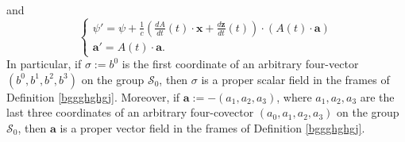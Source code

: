 \documentclass{article}
\theoremstyle{definition}
\theoremstyle{remark}
\renewcommand{\vec}[1]{\mathbf{#1}}
\begin{document}
and
\begin{equation}\label{fgjfjhgghhgjghjhjijhojpiiihjhjuiouj}
\begin{cases}
\psi'=\psi+\frac{1}{c}\left(\frac{dA}{dt}\left(t\right)\cdot\vec
x+\frac{d \vec z}{dt}\left(t\right)\right)\cdot\left(A(t)\cdot\vec
a\right)
\\
\vec a'=A(t)\cdot\vec a.
\end{cases}
\end{equation}
In particular, if $\sigma:=b^0$ is the first coordinate of an
arbitrary four-vector $(b^0,b^1,b^2,b^3)$ on the group
$\mathcal{S}_0$, then $\sigma$ is a proper scalar field in the
frames of Definition \ref{bggghghgj}. Moreover, if $\vec
a:=-(a_1,a_2,a_3)$, where $a_1,a_2,a_3$ are the last three
coordinates of an arbitrary four-covector $(a_0,a_1,a_2,a_3)$ on the
group $\mathcal{S}_0$, then $\vec a$ is a proper vector field in the
frames of Definition \ref{bggghghgj}.
\end{document}

